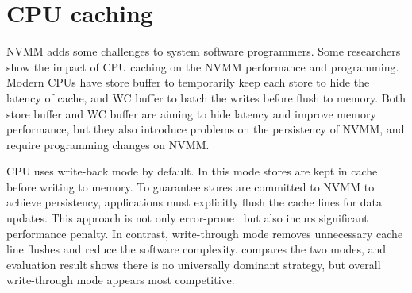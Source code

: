 \section{CPU caching} 
\label{sec:caching}

NVMM adds some challenges to system software programmers.
Some researchers~\cite{CPUcaching}
show the impact of CPU caching on the NVMM performance
and programming. Modern CPUs have store buffer to temporarily keep each store
to hide the latency of cache, and WC buffer to batch the writes before
flush to memory. Both store buffer and WC buffer are aiming to hide latency
and improve memory performance, but they also introduce problems on the
persistency of NVMM, and require programming changes on NVMM.

CPU uses write-back mode by default. In this mode stores are kept in cache
before writing to memory. To guarantee stores are committed to NVMM to achieve
persistency, applications must explicitly flush the cache lines for data
updates. This approach is not only error-prone~\cite{singlelock}
but also incurs significant
performance penalty. In contrast, write-through mode removes unnecessary
cache line flushes and reduce the software complexity. \cite{CPUcaching}
compares the two 
modes, and evaluation result shows there is no universally dominant strategy,
but overall write-through mode appears most competitive.
